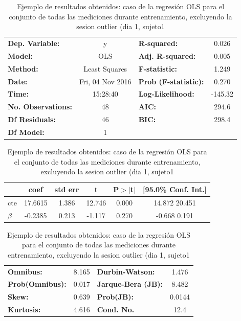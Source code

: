 \documentclass{article}
\begin{document}
\begin {table}

\begin{center}

\caption{Ejemplo de resultados obtenidos: caso de la regresión OLS para el conjunto de todas las mediciones durante entrenamiento, excluyendo la sesion outlier (dia 1, sujeto1}
\label{tabla:entrenamientoGlobal}

\vspace{0.3in}

\begin{tabular}{lclc}
\toprule
\textbf{Dep. Variable:}    &        y         & \textbf{  R-squared:         } &     0.026   \\
\textbf{Model:}            &       OLS        & \textbf{  Adj. R-squared:    } &     0.005   \\
\textbf{Method:}           &  Least Squares   & \textbf{  F-statistic:       } &     1.249   \\
\textbf{Date:}             & Fri, 04 Nov 2016 & \textbf{  Prob (F-statistic):} &    0.270    \\
\textbf{Time:}             &     15:28:40     & \textbf{  Log-Likelihood:    } &   -145.32   \\
\textbf{No. Observations:} &          48      & \textbf{  AIC:               } &     294.6   \\
\textbf{Df Residuals:}     &          46      & \textbf{  BIC:               } &     298.4   \\
\textbf{Df Model:}         &           1      & \textbf{                     } &             \\
\bottomrule
\end{tabular}

\begin{tabular}{lccccc}
               & \textbf{coef} & \textbf{std err} & \textbf{t} & \textbf{P$>|$t$|$} & \textbf{[95.0\% Conf. Int.]}  \\
\midrule
cte &      17.6615  &        1.386     &    12.746  &         0.000        &        14.872    20.451       \\
$\beta$    &      -0.2385  &        0.213     &    -1.117  &         0.270        &        -0.668     0.191       \\
\bottomrule
\end{tabular}

\begin{tabular}{lclc}
\textbf{Omnibus:}       &  8.165 & \textbf{  Durbin-Watson:     } &    1.476  \\
\textbf{Prob(Omnibus):} &  0.017 & \textbf{  Jarque-Bera (JB):  } &    8.482  \\
\textbf{Skew:}          &  0.639 & \textbf{  Prob(JB):          } &   0.0144  \\
\textbf{Kurtosis:}      &  4.616 & \textbf{  Cond. No.          } &     12.4  \\
\bottomrule
\end{tabular}

\end{center}

\end{table}
\end{document}
